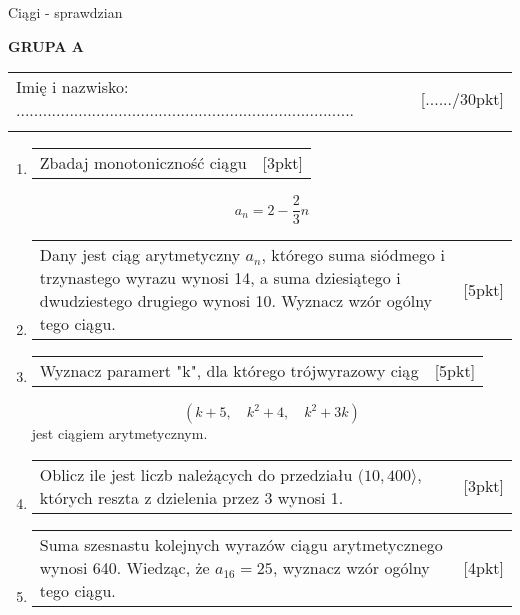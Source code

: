 \documentclass[12pt,a4paper]{article}
\begin{document}
	\begin{center}
		\LARGE Ciągi - sprawdzian
	\end{center}
	\vspace{1.5cm}
	\begin{flushright}
		\textbf{GRUPA A}
	\end{flushright}
	\begin{tabular}{p{13cm} r}
		Imię i nazwisko: ............................................................................
		&[....../30pkt]\\ 
		\vspace{0.5cm}
	\end{tabular}
	\begin{enumerate}[1.]
		\item  \begin{tabular}{p{13cm} r}
			Zbadaj monotoniczność ciągu  &[3pkt]\\ 
		\end{tabular}
	$$a_n=2-\frac{2}{3}n$$
		
		\item  \begin{tabular}{p{13cm} r}
			Dany jest ciąg arytmetyczny $a_n$, którego suma siódmego i trzynastego wyrazu wynosi 14, a suma dziesiątego i dwudziestego drugiego wynosi 10. Wyznacz wzór ogólny tego ciągu. 
			 &[5pkt]\\ 
		\end{tabular}
		
		\item \begin{tabular}{p{13cm} r}
			Wyznacz paramert "k", dla którego trójwyrazowy ciąg
			 &[5pkt]\\
		\end{tabular}
	$$(k+5,\quad k^2+4, \quad k^2+3k)$$
	jest ciągiem arytmetycznym. 
		
		\item \begin{tabular}{p{13cm} r}
			Oblicz ile jest liczb należących do przedziału $(10,400\rangle$, których reszta z dzielenia przez 3 wynosi 1.&[3pkt]\\ 
		\end{tabular}
		
		\item \begin{tabular}{p{13cm} r}
			Suma szesnastu kolejnych wyrazów ciągu arytmetycznego wynosi 640. Wiedząc, że $a_{16}=25$, wyznacz wzór ogólny tego ciągu.&[4pkt]\\ 
		\end{tabular}
		

\end{enumerate}
\end{document}

